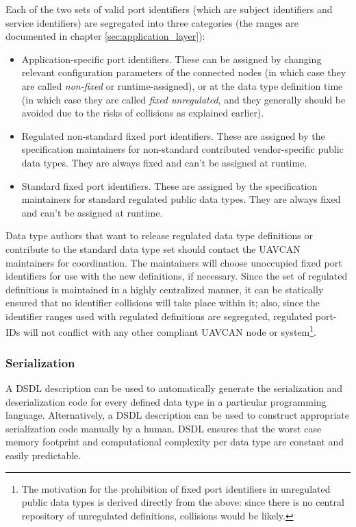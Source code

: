 Each of the two sets of valid port identifiers (which are subject identifiers and service identifiers) are
segregated into three categories (the ranges are documented in chapter \ref{sec:application_layer}):

\begin{itemize}
    \item Application-specific port identifiers.
    These can be assigned by changing relevant configuration parameters of the connected nodes
    (in which case they are called \emph{non-fixed} or runtime-assigned),
    or at the data type definition time (in which case they are called \emph{fixed unregulated},
    and they generally should be avoided due to the risks of collisions as explained earlier).

    \item Regulated non-standard fixed port identifiers.
    These are assigned by the specification maintainers for non-standard contributed
    vendor-specific public data types.
    They are always fixed and can't be assigned at runtime.

    \item Standard fixed port identifiers. These are assigned by the specification maintainers
    for standard regulated public data types.
    They are always fixed and can't be assigned at runtime.
\end{itemize}

Data type authors that want to release regulated data type definitions or contribute to the standard data
type set should contact the UAVCAN maintainers for coordination.
The maintainers will choose unoccupied fixed port identifiers for use with the new definitions, if necessary.
Since the set of regulated definitions is maintained in a highly centralized manner,
it can be statically ensured that no identifier collisions will take place within it;
also, since the identifier ranges used with regulated definitions are segregated,
regulated port-IDs will not conflict with any other compliant UAVCAN node or system\footnote{%
    The motivation for the prohibition of fixed port identifiers in unregulated public data types is
    derived directly from the above: since there is no central repository of unregulated definitions,
    collisions would be likely.
}.

\subsubsection{Serialization}

A DSDL description can be used to automatically generate the serialization and deserialization code
for every defined data type in a particular programming language.
Alternatively, a DSDL description can be used to construct appropriate serialization code manually by a human.
DSDL ensures that the worst case memory footprint and computational complexity per data type
are constant and easily predictable.

